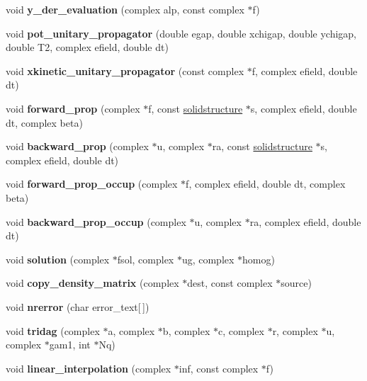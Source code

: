 \begin{DoxyCompactItemize}
void {\bfseries y\+\_\+der\+\_\+evaluation} (complex alp, const complex $\ast$f)
\item 
\mbox{\label{classoperators_a53d6e5ae956d4adc4577f8ba7c4a3914}} 
void {\bfseries pot\+\_\+unitary\+\_\+propagator} (double egap, double xchigap, double ychigap, double T2, complex efield, double dt)
\item 
\mbox{\label{classoperators_a8260fe680fd217b3fa8291cec2c915a9}} 
void {\bfseries xkinetic\+\_\+unitary\+\_\+propagator} (const complex $\ast$f, complex efield, double dt)
\item 
\mbox{\label{classoperators_a6ddbc5130990c4eecc2e42ddd7b90ebe}} 
void {\bfseries forward\+\_\+prop} (complex $\ast$f, const \hyperlink{classsolidstructure}{solidstructure} $\ast$s, complex efield, double dt, complex beta)
\item 
\mbox{\label{classoperators_ab7f9622ec6de892c4c41b0af763d2c9d}} 
void {\bfseries backward\+\_\+prop} (complex $\ast$u, complex $\ast$ra, const \hyperlink{classsolidstructure}{solidstructure} $\ast$s, complex efield, double dt)
\item 
\mbox{\label{classoperators_abcac33b81e1cdc8b76ef1e58976f101c}} 
void {\bfseries forward\+\_\+prop\+\_\+occup} (complex $\ast$f, complex efield, double dt, complex beta)
\item 
\mbox{\label{classoperators_ab96c5c6866545f638e4577c1482eea89}} 
void {\bfseries backward\+\_\+prop\+\_\+occup} (complex $\ast$u, complex $\ast$ra, complex efield, double dt)
\item 
\mbox{\label{classoperators_af1fc95cb65ba7b0ffbd160a13e4dea63}} 
void {\bfseries solution} (complex $\ast$fsol, complex $\ast$ug, complex $\ast$homog)
\item 
\mbox{\label{classoperators_a9314a84077f03d21b56c2fa200e8c22d}} 
void {\bfseries copy\+\_\+density\+\_\+matrix} (complex $\ast$dest, const complex $\ast$source)
\item 
\mbox{\label{classoperators_a770b97be108142e5822f235eb04ca42b}} 
void {\bfseries nrerror} (char error\+\_\+text\mbox{[}$\,$\mbox{]})
\item 
\mbox{\label{classoperators_aa321ce776b8dbe506f2eae1e82705cad}} 
void {\bfseries tridag} (complex $\ast$a, complex $\ast$b, complex $\ast$c, complex $\ast$r, complex $\ast$u, complex $\ast$gam1, int $\ast$Nq)
\item 
\mbox{\label{classoperators_a4a9b84e1102bb00b07346c0fa5e1e814}} 
void {\bfseries linear\+\_\+interpolation} (complex $\ast$inf, const complex $\ast$f)
\end{DoxyCompactItemize}
